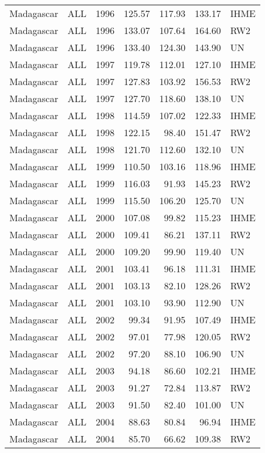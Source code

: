 \begin{longtable}{lllrrrl}
  Madagascar & ALL & 1996 & 125.57 & 117.93 & 133.17 & IHME \\ 
  Madagascar & ALL & 1996 & 133.07 & 107.64 & 164.60 & RW2 \\ 
  Madagascar & ALL & 1996 & 133.40 & 124.30 & 143.90 & UN \\ 
  Madagascar & ALL & 1997 & 119.78 & 112.01 & 127.10 & IHME \\ 
  Madagascar & ALL & 1997 & 127.83 & 103.92 & 156.53 & RW2 \\ 
  Madagascar & ALL & 1997 & 127.70 & 118.60 & 138.10 & UN \\ 
  Madagascar & ALL & 1998 & 114.59 & 107.02 & 122.33 & IHME \\ 
  Madagascar & ALL & 1998 & 122.15 & 98.40 & 151.47 & RW2 \\ 
  Madagascar & ALL & 1998 & 121.70 & 112.60 & 132.10 & UN \\ 
  Madagascar & ALL & 1999 & 110.50 & 103.16 & 118.96 & IHME \\ 
  Madagascar & ALL & 1999 & 116.03 & 91.93 & 145.23 & RW2 \\ 
  Madagascar & ALL & 1999 & 115.50 & 106.20 & 125.70 & UN \\ 
  Madagascar & ALL & 2000 & 107.08 & 99.82 & 115.23 & IHME \\ 
  Madagascar & ALL & 2000 & 109.41 & 86.21 & 137.11 & RW2 \\ 
  Madagascar & ALL & 2000 & 109.20 & 99.90 & 119.40 & UN \\ 
  Madagascar & ALL & 2001 & 103.41 & 96.18 & 111.31 & IHME \\ 
  Madagascar & ALL & 2001 & 103.13 & 82.10 & 128.26 & RW2 \\ 
  Madagascar & ALL & 2001 & 103.10 & 93.90 & 112.90 & UN \\ 
  Madagascar & ALL & 2002 & 99.34 & 91.95 & 107.49 & IHME \\ 
  Madagascar & ALL & 2002 & 97.01 & 77.98 & 120.05 & RW2 \\ 
  Madagascar & ALL & 2002 & 97.20 & 88.10 & 106.90 & UN \\ 
  Madagascar & ALL & 2003 & 94.18 & 86.60 & 102.21 & IHME \\ 
  Madagascar & ALL & 2003 & 91.27 & 72.84 & 113.87 & RW2 \\ 
  Madagascar & ALL & 2003 & 91.50 & 82.40 & 101.00 & UN \\ 
  Madagascar & ALL & 2004 & 88.63 & 80.84 & 96.94 & IHME \\ 
  Madagascar & ALL & 2004 & 85.70 & 66.62 & 109.38 & RW2 \\ 

\end{longtable}
